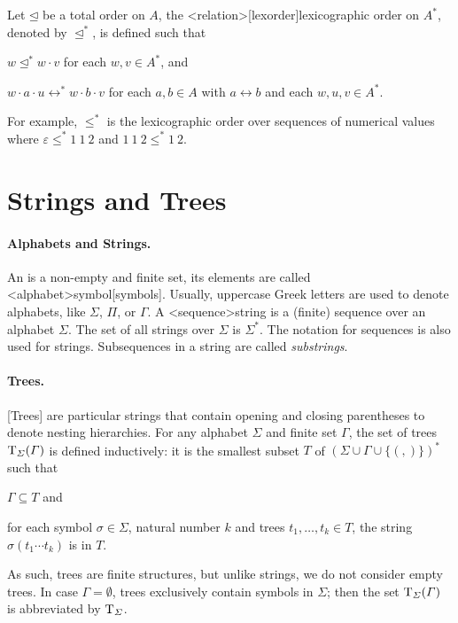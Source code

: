 \documentclass[../document.tex]{subfiles}
\begin{document}
    Let \(\unlhd\) be a total order on \(A\), the <relation>[lexorder]{lexicographic order} on \(A^*\), denoted by \(\unlhd^*\), is defined such that
    \begin{compactenum}
        \item \(w \unlhd^* w \cdot v\) for each \(w, v \in A^*\), and
        \item \(w\cdot a\cdot u \rel^* w\cdot b\cdot v \) for each \(a,b \in A\) with \(a \rel b\) and each \(w,u,v \in A^*\).
    \end{compactenum}
    For example, \(\leq^*\) is the lexicographic order over sequences of numerical values where \(\varepsilon \leq^* 1\:1\:2\) and \(1\:1\:2\leq^*1\:2\).


    \section{Strings and Trees}\label{sec:preliminaries:trees}
    \paragraph{Alphabets and Strings.}
    An  is a non-empty and finite set, its elements are called <alphabet>{symbol}[symbols].
    Usually, uppercase Greek letters are used to denote alphabets, like \(\varSigma\), \(\varPi\), or \(\varGamma\).
    A <sequence>{string} is a (finite) sequence over an alphabet \(\varSigma\).
    The set of all strings over \(\varSigma\) is \(\varSigma^*\).
    The notation for sequences is also used for strings.
    Subsequences in a string are called \emph{substrings}.

    \paragraph{Trees.}
    [Trees] are particular strings that contain opening and closing parentheses to denote nesting hierarchies.
    For any alphabet \(\varSigma\) and finite set \(\varGamma\), the set of trees \(\operatorname{T}_\varSigma(\varGamma)\) is defined inductively: it is the smallest subset \(T\) of \((\varSigma \cup \varGamma \cup \{ (, )\})^*\) such that
    \begin{inparaenum}
        \item \(\varGamma \subseteq T\) and
        \item for each symbol \(\sigma \in \varSigma\), natural number \(k\) and trees \(t_1, \ldots, t_k \in T\), the string \(\sigma(t_1 \cdots t_k)\) is in \(T\).
    \end{inparaenum}
    As such, trees are finite structures, but unlike strings, we do not consider empty trees.
    In case \(\varGamma = \emptyset\), trees exclusively contain symbols in \(\varSigma\); then the set \(\operatorname{T}_\varSigma(\varGamma)\) is abbreviated by \(\operatorname{T}_\varSigma\).
\end{document}
